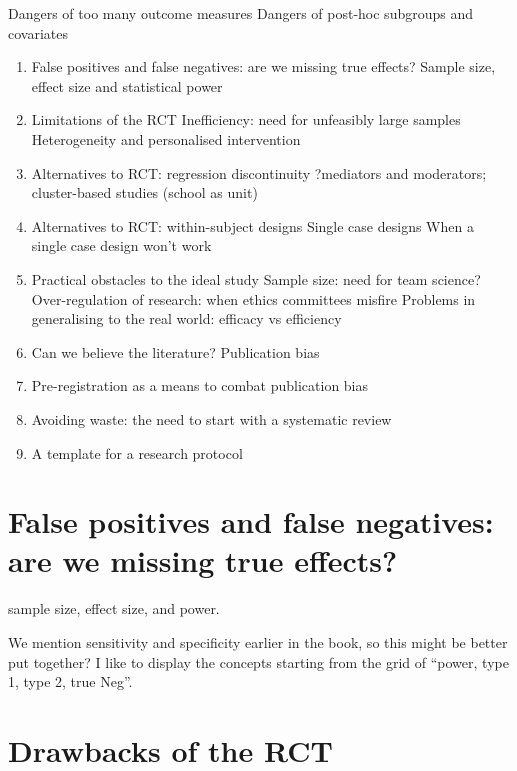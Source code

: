 \documentclass[]{book}
\providecommand{\tightlist}{%
  \setlength{\itemsep}{0pt}\setlength{\parskip}{0pt}}
\begin{document}
Dangers of too many outcome measures
Dangers of post-hoc subgroups and covariates

\begin{enumerate}
\def\labelenumi{\arabic{enumi}.}
\tightlist
\item
  False positives and false negatives: are we missing true effects?
  Sample size, effect size and statistical power
\item
  Limitations of the RCT
  Inefficiency: need for unfeasibly large samples
  Heterogeneity and personalised intervention
\item
  Alternatives to RCT: regression discontinuity
  ?mediators and moderators; cluster-based studies (school as unit)
\item
  Alternatives to RCT: within-subject designs
  Single case designs
  When a single case design won't work
\item
  Practical obstacles to the ideal study
  Sample size: need for team science?
  Over-regulation of research: when ethics committees misfire
  Problems in generalising to the real world: efficacy vs efficiency
\item
  Can we believe the literature? Publication bias
\item
  Pre-registration as a means to combat publication bias
\item
  Avoiding waste: the need to start with a systematic review
\item
  A template for a research protocol
\end{enumerate}

\hypertarget{false-positives-and-false-negatives-are-we-missing-true-effects}{%
\chapter{False positives and false negatives: are we missing true effects?}\label{false-positives-and-false-negatives-are-we-missing-true-effects}}

sample size, effect size, and power.

We mention sensitivity and specificity earlier in the book, so this might be better put together? I like to display the concepts starting from the grid of ``power, type 1, type 2, true Neg''.

\hypertarget{drawbacks-of-the-rct}{%
\chapter{Drawbacks of the RCT}\label{drawbacks-of-the-rct}}
\end{document}

